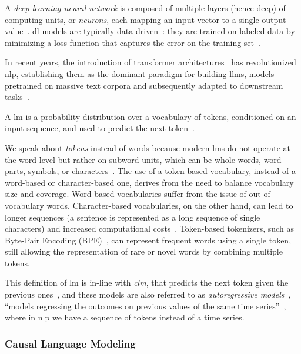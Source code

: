 A \emph{deep learning neural network} is composed of multiple layers (hence deep) of computing units, or \emph{neurons}, each mapping an input vector to a single output value~\cite{jm3}. \Ac{dl} models are typically data-driven~\cite{jm3}: they are trained on labeled data by minimizing a loss function that captures the error on the training set~\cite{hastie2009elements}.

In recent years, the introduction of transformer architectures~\cite{vaswani_transformers_2017} has revolutionized \ac{nlp}, establishing them as the dominant paradigm for building \aclp{llm}, \ie models pretrained on massive text corpora and subsequently adapted to downstream tasks~\cite{gu2024mamba}.
\begin{definition}
     A \acf{lm} is a probability distribution over a vocabulary of tokens, conditioned on an input sequence, and used to predict the next token~\cite{lm_java_methods_2023,jm3}.
\end{definition}
We speak about \emph{tokens} instead of words because modern \acp{lm} do not operate at the word level but rather on subword units, which can be whole words, word parts, symbols, or characters~\cite{comprensive_overview_llm_2025}. The use of a token-based vocabulary, instead of a word-based or character-based one, derives from the need to balance vocabulary size and coverage. Word-based vocabularies suffer from the issue of out-of-vocabulary words. Character-based vocabularies, on the other hand, can lead to longer sequences (a sentence is represented as a long sequence of single characters) and increased computational costs~\cite{sun-etal-2023-characters}. Token-based tokenizers, such as Byte-Pair Encoding (BPE)~\cite{sennrich-etal-2016-neural}, can represent frequent words using a single token, still allowing the representation of rare or novel words by combining multiple tokens.

This definition of \ac{lm} is in-line with \emph{\acf{clm}}, that predicts the next token given the previous ones~\cite{jain-etal-2023-cl-for-causal-lm,jm3}, and these models are also referred to as \emph{autoregressive models}~\cite{jm3}, \ie ``models regressing the outcomes on previous values of the same time series''~\cite{regis2022_autoregressive}, where in \ac{nlp} we have a sequence of tokens instead of a time series.

\subsubsection{Causal Language Modeling}

